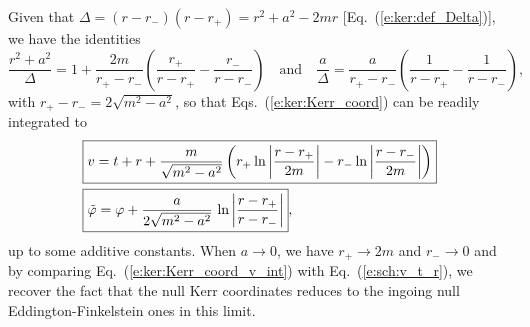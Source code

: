 Given that $\Delta = (r-r_-)(r-r_+) = r^2+a^2 - 2mr$ [Eq.~(\ref{e:ker:def_Delta})], we have
the identities
\[
    \frac{r^2+a^2}{\Delta} = 1 + \frac{2m}{r_+-r_-} \left( \frac{r_+}{r-r_+}
        - \frac{r_-}{r-r_-} \right) \quad\mbox{and}\quad
     \frac{a}{\Delta} = \frac{a}{r_+-r_-} \left( \frac{1}{r-r_+}
        - \frac{1}{r-r_-} \right) ,
\]
with $r_+-r_- = 2\sqrt{m^2-a^2}$,
so that Eqs.~(\ref{e:ker:Kerr_coord}) can be readily integrated to
\begin{subequations}
\label{e:ker:Kerr_coord_int}
\begin{align}
& \fbox{$\displaystyle v = t + r + \frac{m}{\sqrt{m^2-a^2}} \left(
    r_+ \ln\left| \frac{r-r_+}{2m} \right|
    - r_- \ln\left| \frac{r-r_-}{2m} \right| \right) $}\label{e:ker:Kerr_coord_v_int}\\
& \fbox{$\displaystyle  {\tilde\varphi} = \varphi + \frac{a}{2\sqrt{m^2-a^2}}\, \ln \left|
    \frac{r-r_+}{r-r_-} \right| $} , \label{e:ker:Kerr_coord_tph_int}
\end{align}
\end{subequations}
up to some additive constants.
When $a\rightarrow 0$, we have $r_+\rightarrow 2m$ and $r_-\rightarrow 0$
and by comparing Eq.~(\ref{e:ker:Kerr_coord_v_int}) with Eq.~(\ref{e:sch:v_t_r}), we recover the fact
that the null Kerr coordinates reduces to the ingoing null Eddington-Finkelstein
ones in this limit.

